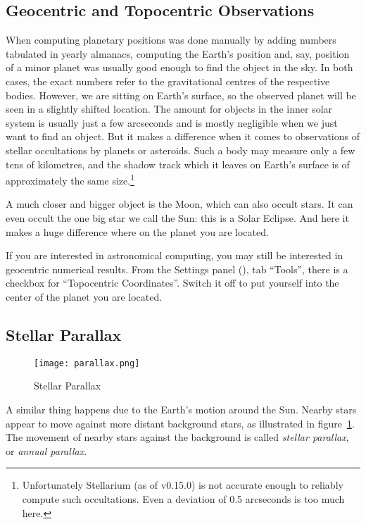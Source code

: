 \subsection{Geocentric and Topocentric Observations}
\label{sec:Concepts:Parallax:Topocentric}


When computing planetary positions was done manually by adding numbers
tabulated in yearly almanacs, computing the Earth's position and, say,
position of a minor planet was usually good enough to find the object
in the sky. In both cases, the exact numbers refer to the
gravitational centres of the respective bodies. However, we are
sitting on Earth's surface, so the observed planet will be seen in a
slightly shifted location. The amount for objects in the inner solar
system is usually just a few arcseconds and is mostly negligible when we
just want to find an object. But it makes a difference when it comes
to observations of stellar occultations by planets or asteroids. Such
a body may measure only a few tens of kilometres, and the shadow track
which it leaves on Earth's surface is of approximately the same
size.\footnote{Unfortunately Stellarium (as of v0.15.0) is not accurate
  enough to reliably compute such occultations. Even a deviation of
  0.5 arcseconds is too much here.}

A much closer and bigger object is the Moon, which can also occult
stars. It can even occult the one big star we call the Sun: this is a
Solar Eclipse. And here it makes a huge difference where on the planet
you are located. 

If you are interested in astronomical computing, you may still be
interested in geocentric numerical results. From the Settings panel
(), tab ``Tools'', there is a checkbox for ``Topocentric
Coordinates''. Switch it off to put yourself into the center of the
planet you are located.

\subsection{Stellar Parallax}
\label{sec:Concepts:StellarParallax}

\begin{figure}[tb]
\centering\texttt{[image: parallax.png]}
\caption{Stellar Parallax}
\label{fig:Parallax}
\end{figure}

A similar thing happens due to the Earth's motion around the Sun. Nearby
stars appear to move against more distant background stars, as
illustrated in figure~\ref{fig:Parallax}.
The movement of nearby stars against the background is called
\emph{stellar parallax}, or \emph{annual parallax}.

